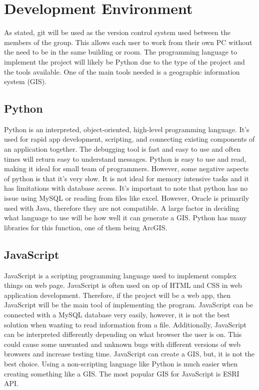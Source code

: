 \documentclass[onecolumn, draftclsnofoot,10pt, compsoc]{IEEEtran}
\begin{document}
\section{Development Environment}
As stated, git will be used as the version control system used between the members of the group. This allows each user to work from their own PC without the need to be in the same building or room. The programming language to implement the project will likely be Python due to the type of the project and the tools available. One of the main tools needed is a geographic information system (GIS).
    \subsection{Python}
    Python is an interpreted, object-oriented, high-level programming language. It's used for rapid app development, scripting, and connecting existing components of an application together. The debugging tool is fast and easy to use and often times will return easy to understand messages\cite{pythonwebsite}. Python is easy to use and read, making it ideal for small team of programmers. However, some negative aspects of python is that it's very slow. It is not ideal for memory intensive tasks and it has limitations with database access. It's important to note that python has no issue using MySQL or reading from files like excel. However, Oracle is primarily used with Java, therefore they are not compatible\cite{pythonproscons}. A large factor in deciding what language to use will be how well it can generate a GIS. Python has many libraries for this function, one of them being ArcGIS\cite{pythongis}.
    
    \subsection{JavaScript}
    JavaScript is a scripting programming language used to implement complex things on web page. JavaScript is often used on op of HTML and CSS in web application development\cite{javascriptsite}. Therefore, if the project will be a web app, then JavaScript will be the main tool of implementing the program. JavaScript can be connected with a MySQL database very easily, however, it is not the best solution when wanting to read information from a file. Additionally, JavaScript can be interpreted differently depending on what browser the user is on. This could cause some unwanted and unknown bugs with different versions of web browsers and increase testing time. JavaScript can create a GIS, but, it is not the best choice. Using a non-scripting language like Python is much easier when creating something like a GIS. The most popular GIS for JavaScript is ESRI API\cite{javascriptgis}.
    
\end{document}
